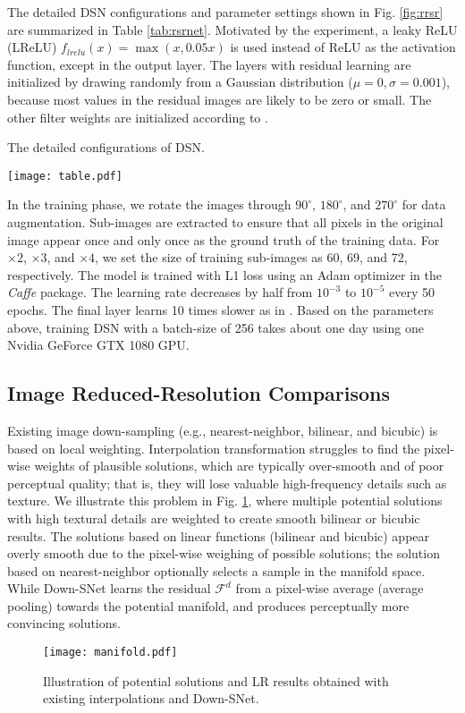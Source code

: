 \documentclass[runningheads]{llncs}
\begin{document}
The detailed DSN configurations and parameter settings shown in Fig. \ref{fig:rrsr} are summarized in Table \ref{tab:rsrnet}. Motivated by the experiment, a leaky ReLU (LReLU) $f_{lrelu}(x) = \max\left({x, 0.05x}\right)$ is used instead of ReLU as the activation function, except in the output layer. The layers with residual learning are initialized by drawing randomly from a Gaussian distribution ($\mu = 0, \sigma = 0.001$), because most values in the residual images are likely to be zero or small. The other filter weights are initialized according to \cite{msra}.
\begin{table}[th]
\center
   \caption{The detailed configurations of DSN.}
    \label{tab:rsrnet}\texttt{[image: table.pdf]}
\end{table}

 In the training phase, we rotate the images through $90^\circ$, $180^\circ$, and $270^\circ$ for data augmentation. Sub-images are extracted to ensure that all pixels in the original image appear once and only once as the ground truth of the training data. For $\times 2$, $\times3$, and $\times4$, we set the size of training sub-images as 60, 69, and 72, respectively. The model is trained with L1 loss using an Adam \cite{adam} optimizer in the \emph{Caffe} \cite{caffe} package. The learning rate decreases by half from $10^{-3}$ to $10^{-5}$ every 50 epochs. The final layer learns 10 times slower as in \cite{srcnn}. Based on the parameters above, training DSN with a batch-size of 256 takes about one day using one Nvidia GeForce GTX 1080 GPU.

\subsection{Image Reduced-Resolution Comparisons}

Existing image down-sampling (e.g., nearest-neighbor, bilinear, and bicubic) is based on local weighting. Interpolation transformation struggles to find the pixel-wise weights of plausible solutions, which are typically over-smooth and of poor perceptual quality; that is, they will lose valuable high-frequency details such as texture. We illustrate this problem in Fig. \ref{fig:mainfold}, where multiple potential solutions with high textural details are weighted to create smooth bilinear or bicubic results. The solutions based on linear functions (bilinear and bicubic) appear overly smooth due to the pixel-wise weighing of possible solutions; the solution based on nearest-neighbor optionally selects a sample in the manifold space. While Down-SNet learns the residual $\mathcal{F}^d$ from a pixel-wise average (average pooling) towards the potential manifold, and produces perceptually more convincing solutions.
\begin{figure}[H]
\begin{center}
\texttt{[image: manifold.pdf]}
\end{center}
   \caption{Illustration of potential solutions and LR results obtained with existing interpolations and Down-SNet.}
\label{fig:mainfold}
\end{figure}
\end{document}
